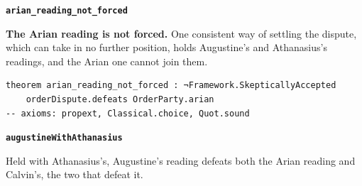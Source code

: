 \documentclass[11pt,paper=\testimonypaper,DIV=13,parskip=false]{scrartcl}
\begin{document}
\par\medskip\noindent\textbf{\texttt{arian\_\allowbreak{}reading\_\allowbreak{}not\_\allowbreak{}forced}}\par\nobreak\noindent
\textbf{The Arian reading is not forced.} One consistent way of settling the dispute, which can take in no further position, holds Augustine’s and Athanasius’s readings, and the Arian one cannot join them.

{\small\begin{verbatim}
theorem arian_reading_not_forced : ¬Framework.SkepticallyAccepted
    orderDispute.defeats OrderParty.arian
-- axioms: propext, Classical.choice, Quot.sound
\end{verbatim}}
\par\medskip\noindent\textbf{\texttt{augustine\allowbreak{}With\allowbreak{}Athanasius}}\par\nobreak\noindent
Held with Athanasius’s, Augustine’s reading defeats both the Arian reading and Calvin’s, the two that defeat it.
\end{document}
